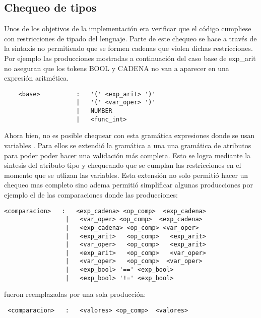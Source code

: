 \subsection{Chequeo de tipos}

Unos de los objetivos de la implementación era verificar que el código cumpliese con restricciones de tipado del lenguaje. Parte de este chequeo se hace a través de la sintaxis no permitiendo  que se formen cadenas que violen dichas restricciones. 
Por ejemplo las producciones mostradas a continuación del caso  base de exp\_arit no aseguran que los tokens BOOL y CADENA no van a aparecer en una expresión aritmética. 
\begin{verbatim}
    <base>          :   '(' <exp_arit> ')'
                    |   '(' <var_oper> ')'
                    |   NUMBER
                    |   <func_int>

\end{verbatim}
	Ahora bien, no es posible chequear con esta gramática expresiones donde se usan variables . Para ellos se extendió la gramática a una una gramática de atributos para poder poder hacer una validación más completa. Esto se logra mediante la sintesis del atributo tipo y chequeando que se cumplan las restricciones en el momento que se utlizan las variables. Esta extensión no solo permitió hacer un chequeo mas completo sino adema permitió simplificar algunas producciones por ejemplo el de las comparaciones donde las producciones:
    
\begin{verbatim}
<comparacion>   :   <exp_cadena> <op_comp>  <exp_cadena>
                 |   <var_oper> <op_comp>  <exp_cadena>
                 |   <exp_cadena> <op_comp> <var_oper> 
                 |   <exp_arit>   <op_comp>   <exp_arit>
                 |   <var_oper>   <op_comp>   <exp_arit>
                 |   <exp_arit>   <op_comp>   <var_oper>
                 |   <var_oper>   <op_comp>  <var_oper>
                 |   <exp_bool> '==' <exp_bool>
                 |   <exp_bool> '!=' <exp_bool>
\end{verbatim}
fueron reemplazadas por una sola producción:
\begin{verbatim}
 <comparacion>   :   <valores> <op_comp>  <valores>
\end{verbatim}
 



